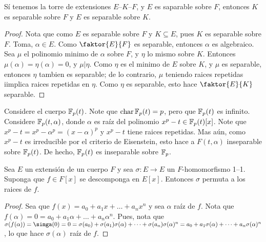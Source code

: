 \begin{lemma}\label{lemma_92}
    S\'i tenemos la torre de extensiones $E$--$K$--$F$, y  $E$ es saparable
    sobre  $F$, entonces  $K$ es separable sobre $F$  y $E$ es separable sobre
    $K$.
\end{lemma}
\begin{proof}
    Nota que como $E$ es separable sobre  $F$ y  $K \subseteq E$, pues  $K$ es
    separable sobre  $F$. Toma,  $\alpha \in E$. Como  $\faktor{E}{F}$ es
    separable, entonces $\alpha$ es algebraico. Sea  $\mu$ el polinomio minimo
    de  $\alpha$ sobre  $F$, y  $\eta$ lo mismo sobre  $K$. Entonces
    $\mu(\alpha)=\eta(\alpha)=0$, y $\mu|\eta$. Como  $\eta$ es el minimo de $E$
    sobre $K$, y  $\mu$ es separable, entonces  $\eta$ tambien es separable; de
    lo contrario, $\mu$ teniendo raices repetidas iimplica raices repetidas en
    $\eta$. Como $\eta$ es separable, esto hace $ \faktor{E}{K}$ separable.
\end{proof}

\begin{example}\label{}
    Considere el cuerpo $\mathbb{F}_p(t)$. Note que $\operatorname{char}{\mathbb{F}_p(t)}=p$, pero que
    $\mathbb{F}_p(t)$ es infinito. Considere $ \mathbb{F}_p(t,\alpha)$, donde $\alpha$ es ra\'iz
    del polinomio  $x^p-t \in \mathbb{F}_p(t)[x]$. Note que
    $x^p-t=x^p-\alpha^p=(x-\alpha)^p$ y $x^p-t$ tiene raices repetidas. Mas
    a\'un, como  $x^p-t$ es irreducible por el criterio de Eisenstein, esto
    hace a  $F(t,\alpha)$ inseparable sobre $\mathbb{F}_p(t)$. De hecho, $\mathbb{F}_p(t)$ es
    inseparable sobre $\mathbb{F}_p$.
\end{example}

\begin{lemma}[Galois]\label{lemma_93}
    Sea $E$ un extensi\'on de un cuerpo  $F$ y sea $\sigma:E \xrightarrow{} E$ un
    $F$-homomorfismo 1--1. Suponga que $f \in F[x]$ se descomponga en  $E[x]$.
    Entonces $\sigma$ permuta a los raices de  $f$.
\end{lemma}
\begin{proof}
    Sea que $f(x)=a_0+a_1x+\dots+a_nx^n$ y sea $\alpha$ ra\'iz de $f$. Nota que
    $f(\alpha)=0=a_0+a_1\alpha+\dots+a_n\alpha^n$. Pues, nota que
    $\sigma(f(\alpha))=\simga(0)=0=\sigma(a_0)+\sigma(a_1)\sigma(\alpha)+\dots+
    \sigma(a_n)\sigma(\alpha)^n=a_0+a_1\sigma(\alpha)+\dots+a_n\sigma(\alpha)^n$,
    lo que hace $\sigma(\alpha)$ ra\'iz de $f$.
\end{proof}
